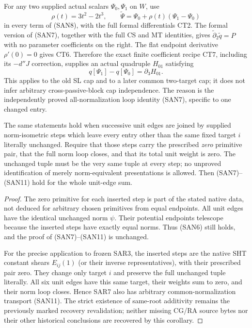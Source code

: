 For any two supplied actual scalars $\Psi_0,\Psi_1$ on $W$, use
\[
 \rho(t)=3t^2-2t^3,\qquad
 \widetilde\Psi=\Psi_0+\rho(t)(\Psi_1-\Psi_0)
 \tag{SAN10}
\]
in every term of (SAN8), with the full formal differentials CT2.
The formal version of (SAN7), together with the full CS and MT
identities, gives $\widetilde\partial_2\widetilde q=P$ with no
parameter coefficients on the right.  The flat endpoint derivative
$\rho'(0)=0$ gives CT6.  Therefore the exact finite coefficient
recipe CT7, including its $-d''J$ correction, supplies an actual
quadruple $H_{01}$ satisfying
\[
               q[\Psi_1]-q[\Psi_0]=\partial_3H_{01}.
 \tag{SAN11}
\]
This applies to the old SL cap and to a later common two-target cap;
it does not infer arbitrary cross-passive-block cap independence.
The reason is the independently proved all-normalization loop
identity (SAN7), specific to one changed entry.

\begin{corollary}
The same statements hold when successive unit edges are joined by
supplied norm-isometric steps which leave every entry other than
the same fixed target $i$ literally unchanged.  Require that those
steps carry the prescribed \emph{zero} primitive pair, that the
full norm loop closes, and that its total unit weight is zero.
The unchanged tuple must be the very same tuple at every step;
no unproved identification of merely norm-equivalent presentations
is allowed.  Then (SAN7)--(SAN11) hold for the whole unit-edge sum.
\end{corollary}

\begin{proof}
The zero primitive for each inserted step is part of the stated
native data, not deduced for arbitrary chosen primitives from equal
endpoints.  All unit edges have the identical unchanged norm
$\psi$.  Their potential endpoints telescope because the inserted
steps have exactly equal norms.  Thus (SAN6) still holds, and the
proof of (SAN7)--(SAN11) is unchanged.

For the precise application to frozen SAR3, the inserted steps are
the native SHT constant shears $E_{ij}(1)$ (or their inverse
representatives), with their prescribed pair zero.  They change
only target $i$ and preserve the full unchanged tuple literally.
All six unit edges have this same target, their weights sum to
zero, and their norm loop closes.  Hence SAR7 also has arbitrary
common-normalization transport (SAN11).  The strict existence of
same-root additivity remains the previously marked recovery
revalidation; neither missing CG/RA source bytes nor their other
historical conclusions are recovered by this corollary.
\end{proof}

